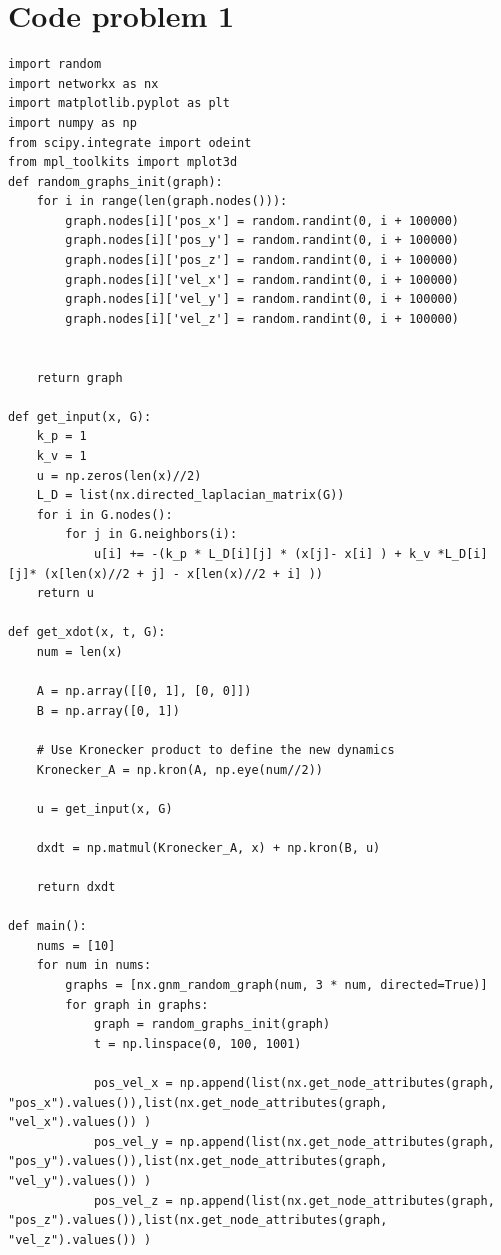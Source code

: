 \documentclass{article}
\begin{document}
\section*{Code problem 1}
\begin{verbatim}
import random
import networkx as nx
import matplotlib.pyplot as plt
import numpy as np
from scipy.integrate import odeint
from mpl_toolkits import mplot3d
def random_graphs_init(graph):
    for i in range(len(graph.nodes())):
        graph.nodes[i]['pos_x'] = random.randint(0, i + 100000)
        graph.nodes[i]['pos_y'] = random.randint(0, i + 100000)
        graph.nodes[i]['pos_z'] = random.randint(0, i + 100000)
        graph.nodes[i]['vel_x'] = random.randint(0, i + 100000)
        graph.nodes[i]['vel_y'] = random.randint(0, i + 100000)
        graph.nodes[i]['vel_z'] = random.randint(0, i + 100000)
        

    return graph

def get_input(x, G):
    k_p = 1
    k_v = 1
    u = np.zeros(len(x)//2)
    L_D = list(nx.directed_laplacian_matrix(G))
    for i in G.nodes():
        for j in G.neighbors(i):
            u[i] += -(k_p * L_D[i][j] * (x[j]- x[i] ) + k_v *L_D[i][j]* (x[len(x)//2 + j] - x[len(x)//2 + i] ))
    return u

def get_xdot(x, t, G):
    num = len(x)

    A = np.array([[0, 1], [0, 0]])
    B = np.array([0, 1])
    
    # Use Kronecker product to define the new dynamics
    Kronecker_A = np.kron(A, np.eye(num//2))
    
    u = get_input(x, G)

    dxdt = np.matmul(Kronecker_A, x) + np.kron(B, u)
    
    return dxdt 

def main():
    nums = [10]
    for num in nums:
        graphs = [nx.gnm_random_graph(num, 3 * num, directed=True)]
        for graph in graphs:
            graph = random_graphs_init(graph)
            t = np.linspace(0, 100, 1001)

            pos_vel_x = np.append(list(nx.get_node_attributes(graph, "pos_x").values()),list(nx.get_node_attributes(graph, "vel_x").values()) )
            pos_vel_y = np.append(list(nx.get_node_attributes(graph, "pos_y").values()),list(nx.get_node_attributes(graph, "vel_y").values()) )
            pos_vel_z = np.append(list(nx.get_node_attributes(graph, "pos_z").values()),list(nx.get_node_attributes(graph, "vel_z").values()) )
            

\end{verbatim}
\end{document}
